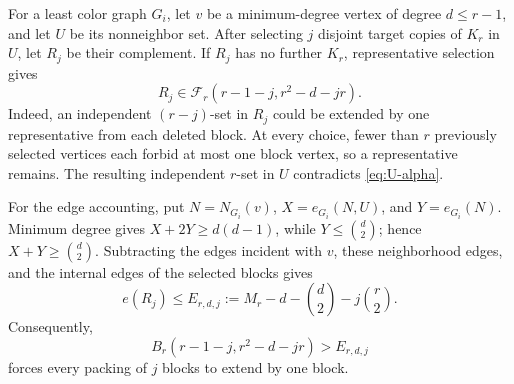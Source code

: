 \documentclass[11pt,reqno,a4paper]{amsart}
\theoremstyle{definition}
\theoremstyle{remark}
\begin{document}
For a least color graph $G_i$, let $v$ be a minimum-degree vertex of
degree $d\leq r-1$, and let $U$ be its nonneighbor set. After selecting
$j$ disjoint target copies of $K_r$ in $U$, let $R_j$ be their
complement. If $R_j$ has no further $K_r$, representative selection gives
\[
 R_j\in\mathcal F_r(r-1-j,r^2-d-jr).
\]
Indeed, an independent $(r-j)$-set in $R_j$ could be extended by one
representative from each deleted block. At every choice, fewer than $r$
previously selected vertices each forbid at most one block vertex, so a
representative remains. The resulting independent $r$-set in $U$
contradicts \eqref{eq:U-alpha}.

For the edge accounting, put $N=N_{G_i}(v)$,
$X=e_{G_i}(N,U)$, and $Y=e_{G_i}(N)$. Minimum degree gives
$X+2Y\geq d(d-1)$, while $Y\leq\binom d2$; hence
$X+Y\geq\binom d2$. Subtracting the edges incident with $v$, these
neighborhood edges, and the internal edges of the selected blocks gives
\begin{equation}\label{eq:entry-upper}
 e(R_j)\leq E_{r,d,j}:=
 M_r-d-\binom d2-j\binom r2.
\end{equation}
Consequently,
\begin{equation}\label{eq:entry-criterion}
 B_r(r-1-j,r^2-d-jr)>E_{r,d,j}
\end{equation}
forces every packing of $j$ blocks to extend by one block.
\end{document}
